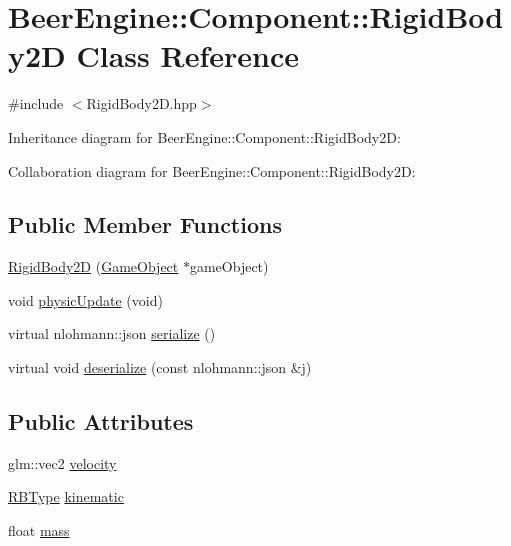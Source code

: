 \hypertarget{class_beer_engine_1_1_component_1_1_rigid_body2_d}{}\section{Beer\+Engine\+:\+:Component\+:\+:Rigid\+Body2D Class Reference}
\label{class_beer_engine_1_1_component_1_1_rigid_body2_d}


{\ttfamily \#include $<$Rigid\+Body2\+D.\+hpp$>$}



Inheritance diagram for Beer\+Engine\+:\+:Component\+:\+:Rigid\+Body2D\+:


Collaboration diagram for Beer\+Engine\+:\+:Component\+:\+:Rigid\+Body2D\+:
\subsection*{Public Member Functions}
\begin{DoxyCompactItemize}
\item 
\mbox{\hyperlink{class_beer_engine_1_1_component_1_1_rigid_body2_d_a5f0d9faa4cd26f4628f9af1601868e3d}{Rigid\+Body2D}} (\mbox{\hyperlink{class_beer_engine_1_1_game_object}{Game\+Object}} $\ast$game\+Object)
\item 
void \mbox{\hyperlink{class_beer_engine_1_1_component_1_1_rigid_body2_d_ab452ad926f43ec0cb06ace5f187d8efd}{physic\+Update}} (void)
\item 
virtual nlohmann\+::json \mbox{\hyperlink{class_beer_engine_1_1_component_1_1_rigid_body2_d_afd6b6d4073e564a1c536243027bb8597}{serialize}} ()
\item 
virtual void \mbox{\hyperlink{class_beer_engine_1_1_component_1_1_rigid_body2_d_ae070289cdf3c6fde105671d41ee8315a}{deserialize}} (const nlohmann\+::json \&j)
\end{DoxyCompactItemize}
\subsection*{Public Attributes}
\begin{DoxyCompactItemize}
\item 
glm\+::vec2 \mbox{\hyperlink{class_beer_engine_1_1_component_1_1_rigid_body2_d_a485653f0ef04660b094871be32a6b0a7}{velocity}}
\item 
\mbox{\hyperlink{namespace_beer_engine_1_1_component_a2cfe279cc309b6420e792597940b8a33}{R\+B\+Type}} \mbox{\hyperlink{class_beer_engine_1_1_component_1_1_rigid_body2_d_a38906d52d817c362f4c9e226e21bf29f}{kinematic}}
\item 
float \mbox{\hyperlink{class_beer_engine_1_1_component_1_1_rigid_body2_d_a65249c4a9bb801725bfb4235e8d0f244}{mass}}
\end{DoxyCompactItemize}
